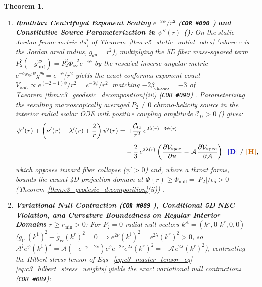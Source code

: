 \documentclass[11pt,a4paper]{article}
\newcommand{\catD}{\text{\textbf{\textcolor{blue!75!black}{[D]}}}}
\newcommand{\catH}{\text{\textbf{\textcolor{orange!80!black}{[H]}}}}
\theoremstyle{definition}
\theoremstyle{plain}
\newtheorem{theorem}[axiom]{Theorem}
\theoremstyle{remark}
\begin{document}
\begin{theorem}
\begin{enumerate}[label=(\roman*)]
  \item \textbf{Routhian Centrifugal Exponent Scaling $e^{-3\psi}/r^2$ (\texttt{COR~\#090} \catD) and Constitutive Source Parameterization in $\psi''(r)$ (\catH):}
  On the static Jordan-frame metric $ds_5^2$ of Theorem~\ref{thm:c5_static_radial_odes} (where $r$ is the Jordan areal radius, $g_{\theta\theta} = r^2$), multiplying the 5D fiber mass-squared term $P_2^2(-g^{22}_{\mathrm{proj}}) = P_2^2\Phi_\infty^{-2}e^{-2\psi}$ by the rescaled inverse angular metric $e^{-c_{\mathrm{Weyl}}\psi}g^{\theta\theta} = e^{-\psi}/r^2$ yields the exact conformal exponent count $V_{\mathrm{cent}} \propto e^{(-2-1)\psi}/r^2 = e^{-3\psi}/r^2$, matching $-2\beta_{\mathrm{chrono}} = -3$ of Theorem~\ref{thm:c3_geodesic_decomposition}(iii) (\texttt{COR~\#090}) \catD. Parameterizing the resulting macroscopically averaged $P_2 \neq 0$ chrono-helicity source in the interior radial scalar ODE with positive coupling amplitude $\mathcal{C}_\Omega > 0$ (\catH) gives:
  \begin{equation}\label{eq:c5_interior_centrifugal_ode}
  \begin{aligned}
  \psi''(r) + \left(\nu'(r) - \lambda'(r) + \frac{2}{r}\right)\psi'(r) &= +\frac{\mathcal{C}_\Omega}{r^2}\,e^{2\lambda(r) - 3\psi(r)} \\[3pt]
  &\quad - \frac{2}{3}\,e^{2\lambda(r)}\left(\frac{\partial\mathcal{V}_{\mathrm{spec}}}{\partial\psi} - \mathcal{A}\,\frac{\partial\mathcal{V}_{\mathrm{spec}}}{\partial\mathcal{A}}\right) \;\;\catD\text{ / }\catH,
  \end{aligned}
  \end{equation}
  which opposes inward fiber collapse ($\psi' > 0$) and, where a throat forms, bounds the causal 4D projection domain at $\Phi(r) \ge \Phi_{\mathrm{null}} = |P_2|/\epsilon_5 > 0$ (Theorem~\ref{thm:c3_geodesic_decomposition}(ii)) \catD.
  \item \textbf{Variational Null Contraction (\texttt{COR~\#089} \catD), Conditional 5D NEC Violation, and Curvature Boundedness on Regular Interior Domains $r \ge r_{\min} > 0$:}
  For $P_2 = 0$ radial null vectors $k^A = (k^1, 0, k^r, 0, 0)$ ($\tilde{g}_{11}(k^1)^2 + \tilde{g}_{rr}(k^r)^2 = 0 \implies e^{2\nu}(k^1)^2 = e^{2\lambda}(k^r)^2 > 0$, so $\mathcal{A}^2 e^\psi(k^1)^2 = \mathcal{A}(-e^{-\psi+2\nu})e^\psi e^{-2\nu}e^{2\lambda}(k^r)^2 = -\mathcal{A}\,e^{2\lambda}(k^r)^2$), contracting the Hilbert stress tensor of Eqs.~\eqref{eq:c3_master_tensor_eq}--\eqref{eq:c3_hilbert_stress_weights} yields the exact variational null contractions (\texttt{COR~\#089}):

\end{enumerate}
\end{theorem}
\end{document}

